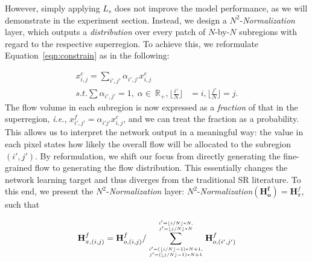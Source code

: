 However, simply applying $L_s$ does not improve the model performance, as we will demonstrate in the experiment section. Instead, we design a $N^2$-\textit{Normalization} layer, which outputs a \textit{distribution} over every patch of $N$-by-$N$ subregions with regard to the respective superregion. To achieve this, we reformulate Equation~\ref{eqn:constrain} as in the following:
\iffalse
\begin{equation}
	\begin{aligned}
	x^c_{i,j} &= \textstyle{\sum_{\left\lfloor{\frac{i'}{N}}\right\rfloor=i,\left\lfloor{\frac{j'}{N}}\right\rfloor=j}{\alpha^{\;}_{i',j'}x^c_{i,j}}}\\
	s.t. &\sum{\alpha_{i',j'}}=1, \;\alpha\in~\mathbb{R}_{+}
	\end{aligned}
\end{equation}
\fi
\begin{equation}
	\begin{aligned}
	x^c_{i,j} = \sum_{i',j'}{\alpha^{\;}_{i',j'}x^c_{i,j}}\\
	s.t. \sum{\alpha_{i',j'}}=1, \;\alpha\in~\mathbb{R}_{+}, \lfloor{\frac{i'}{N}}\rfloor&=i,\lfloor{\frac{j'}{N}}\rfloor=j.
	\end{aligned}
\end{equation}
The flow volume in each subregion is now expressed as a \textit{fraction} of that in the superregion, \emph{i.e.}, $x^f_{i',j'}=\alpha^{\;}_{i'j'}x^c_{i,j}$, and we can treat the fraction as a probability. This allows us to interpret the network output in a meaningful way: the value in each pixel states how likely the overall flow will be allocated to the subregion $(i',j')$. By reformulation, we shift our focus from directly generating the fine-grained flow to generating the flow distribution. This essentially changes the network learning target and thus diverges from the traditional SR literature. To this end, we present the $N^2$-\textit{Normalization} layer: $N^2$-\textit{Normalization}$(\mathbf{H_o^f}) = \mathbf{H}^f_\pi$, such that
\iffalse
which takes a feature map as input and outputs a flow distribution map $\mathbf{H}^f_\pi\in\mathbb{R}^{NI\times NJ}$ 
\begin{equation}
	N^2\_Normalization(\mathbf{X}) = x_{i,j}/\sum_{i'=(\lfloor{i/N}\rfloor-1)*N \atop j'=(\lfloor{j/N}\rfloor-1)*N}^{i'=\lfloor{i/N}\rfloor*N-1 \atop j'=\lfloor{j/N}\rfloor*N-1}{x_{i',j'}}.
	\label{eqn:n2}
\end{equation}
$\mathbf{H}^f_\pi\in\mathbb{R}^{NI\times NJ}$
\fi
\begin{equation}
	\mathbf{H}^{f}_{\pi,(i,j)}=\mathbf{H}^{f}_{o,(i,j)}/\sum_{i'=(\lfloor{i/N}\rfloor-1)*N+1, \atop j'=(\lfloor{j/N}\rfloor-1)*N+1}^{i'=\lfloor{i/N}\rfloor*N, \atop j'=\lfloor{j/N}\rfloor*N}{\mathbf{H}^{f}_{o,(i',j')}}
	\label{eqn:n2}
\end{equation}



